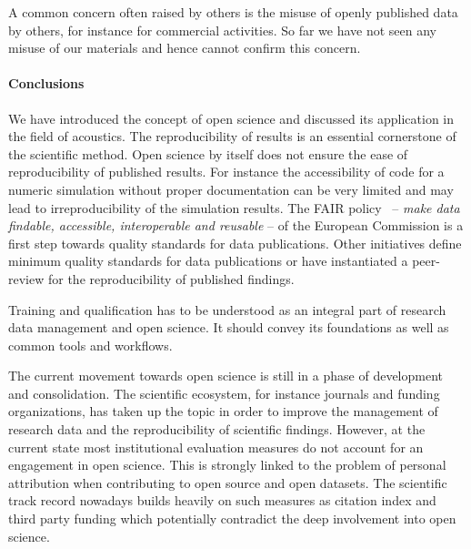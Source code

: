 \documentclass[a4paper, 10pt, twocolumn]{article}
\begin{document}
A common concern often raised by others is the misuse of openly published data by others, 
for instance for commercial activities. So far we have not seen any misuse of our
materials and hence cannot confirm this concern.

\paragraph*{Conclusions}

We have introduced the concept of open science and discussed its application in the
field of acoustics. The reproducibility of results is an essential cornerstone of
the scientific method. Open science by itself does not ensure the ease of reproducibility of
published results. For instance the accessibility of code for a numeric simulation without
proper documentation can be very limited and may lead to irreproducibility of the simulation results. 
The FAIR policy~\cite{H2020_FAIR:ERC} -- \emph{make data findable, accessible, interoperable and reusable} -- 
of the European Commission is a first step towards quality standards for 
data publications. Other initiatives define minimum quality standards for data publications 
or have instantiated a peer-review for the reproducibility of published findings.  

Training and qualification has to be understood as an integral part of research data 
management and open science. It should convey its foundations as well as common tools 
and workflows.

The current movement towards open science is still in a phase of development and 
consolidation. The scientific ecosystem, for instance journals and funding organizations, 
has taken up the topic in order to improve the management of research data and the 
reproducibility of scientific findings. However, at the current state most institutional 
evaluation measures do not account for an engagement in open science. This is strongly 
linked to the problem of personal attribution when contributing to open source and open 
datasets. The scientific track record nowadays builds heavily on such measures as 
citation index and third party funding which potentially contradict the deep involvement 
into open science.

{


}
\end{document}
